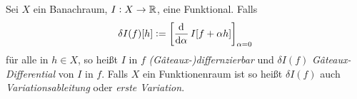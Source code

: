 \begin{definition}[Funktionalableitung]
Sei $X$ ein Banachraum, $I:X\to \mathbb{R}$, eine Funktional. Falls
\begin{equation}
\delta I(f)[h]:=\left[\dod{}{\alpha}I[f+\alpha
h]\right]_{\alpha=0}\label{eq:varderdef}
\end{equation}
für alle in $h\in X$, so heißt $I$ in $f$ \emph{(Gâteaux-)differnzierbar} und
$\delta I(f)$ \emph{Gâteaux-Differential} von $I$ in $f$. Falls $X$ ein
Funktionenraum ist so heißt $\delta I(f)$ auch \emph{Variationsableitung} oder
\emph{erste Variation}.
%
\end{definition}
